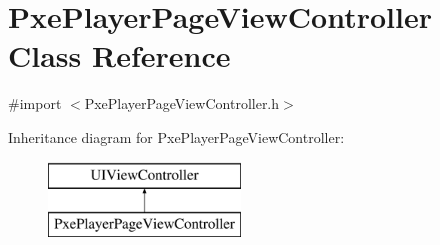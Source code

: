 \hypertarget{interface_pxe_player_page_view_controller}{\section{Pxe\-Player\-Page\-View\-Controller Class Reference}
\label{interface_pxe_player_page_view_controller}
}


{\ttfamily \#import $<$Pxe\-Player\-Page\-View\-Controller.\-h$>$}

Inheritance diagram for Pxe\-Player\-Page\-View\-Controller\-:\begin{figure}[H]
\begin{center}
\leavevmode
\includegraphics[height=2.000000cm]{interface_pxe_player_page_view_controller}
\end{center}
\end{figure}
